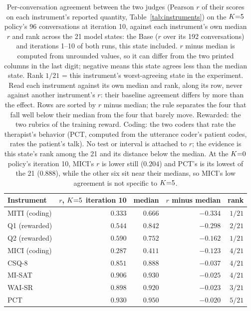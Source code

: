 \begin{table}[!b]
\centering
\small
\setlength{\tabcolsep}{4pt}
\begin{tabular}{@{}lrrrr@{}}
\toprule
Instrument & \shortstack[r]{$r$, $\Kf$\\iteration 10} & median & \shortstack[r]{$r$ minus\\median} & rank\\
\midrule
MITI (coding)   & $0.333$ & $0.666$ & $-0.334$ & $1/21$\\
Q1 (rewarded)   & $0.544$ & $0.842$ & $-0.298$ & $2/21$\\
Q2 (rewarded)   & $0.590$ & $0.752$ & $-0.162$ & $1/21$\\
MICI (coding)   & $0.287$ & $0.411$ & $-0.123$ & $4/21$\\
\midrule
CSQ-8           & $0.851$ & $0.888$ & $-0.037$ & $4/21$\\
MI-SAT          & $0.906$ & $0.930$ & $-0.025$ & $4/21$\\
WAI-SR          & $0.898$ & $0.920$ & $-0.023$ & $3/21$\\
PCT             & $0.930$ & $0.950$ & $-0.020$ & $5/21$\\
\bottomrule
\end{tabular}
\caption{Per-conversation agreement between the two judges (Pearson $r$ of their scores on each instrument's reported quantity, Table~\ref{tab:instruments})
on the $\Kf$ policy's 96 conversations at iteration 10, against each instrument's own median $r$
and rank across the 21 model states: the Base ($r$ over its 192 conversations) and iterations
1--10 of both runs, this state included. $r$ minus median is computed from unrounded values, so it
can differ from the two printed columns in the last digit; negative means this state agrees less
than the median state. Rank $1/21$ = this instrument's worst-agreeing state in the experiment. Read each instrument against
its own median and rank, along its row, never against another instrument's $r$: their baseline
agreement differs by more than the effect. Rows are sorted by $r$ minus median; the rule separates
the four that fall well below their median from the four that barely move. Rewarded: the two rubrics
of the training reward. Coding: the two coders that rate the therapist's behavior (PCT, computed
from the utterance coder's patient codes, rates the patient's talk). No test or interval is attached to $r$;
the evidence is this state's rank among the 21 and its distance below the median. At the $K{=}0$
policy's iteration 10, MICI's $r$ is lower still ($0.204$) and PCT's is its lowest of the 21
($0.888$), while the other six sit near their medians, so MICI's low agreement is not specific to
$\Kf$.}
\label{tab:agreement}
\end{table}


